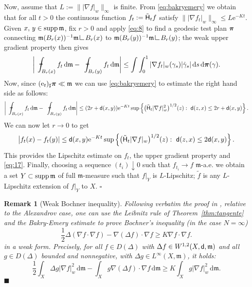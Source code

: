 \documentclass[reqno,11pt]{article}
\numberwithin{equation}{section}
\newcommand{\mm}{{\mbox{\boldmath$m$}}}
\newcommand{\ppi}{{\mbox{\boldmath$\pi$}}}
\newcommand{\sfd}{{\sf d}}
\newcommand{\rme}{{\mathrm e}}
\newcommand{\supp}{\mathop{\rm supp}\nolimits}   %
\renewcommand{\d}{{\mathrm d}}
\newcommand{\media}{\mkern12mu\hbox{\vrule height4pt           %
          depth-3.2pt                                 %
          width5pt}\mkern-16.5mu\int\nolimits}        %
\newenvironment{proof}{\removelastskip\par\medskip   %
\noindent{\em Proof.}
\rm}{\penalty-20\null\hfill$\square$\par\medbreak}
\newtheorem{remark}[theorem]{Remark}
\newcommand{\e}{{\rm{e}}}                           %
\newcommand{\fr}{\hfill$\blacksquare$}                      %
\newcommand{\weakgrad}[1]{|\nabla #1|_w}                %
\newcommand{\res}{\mathop{\hbox{\vrule height 7pt width .5pt depth 0pt
\vrule height .5pt width 6pt depth 0pt}}\nolimits} %
\newcommand{\heatl}{{\sf H}}
\newcommand{\Deltam}{\Delta}
\renewcommand{\mm}{\mathfrak m}
\begin{document}
\begin{proof}
Now, assume that $L:=\|\weakgrad{f}\|_\infty$ is finite. From
\eqref{eq:bakryemery} we obtain that for all $t>0$ the continuous
function $f_t:=\tilde\heatl_t f$ satisfy
$\|\weakgrad{f_t}\|_\infty\leq L\rme^{-Kt}$. Given
$x,\,y\in\supp\mm$, fix $r>0$ and apply \eqref{eq:8} to find a
geodesic test plan $\ppi$ connecting $\mm(B_r(x))^{-1} \mm\res
B_r(x)$ to $\mm(B_r(y))^{-1} \mm\res B_r(y)$; the weak upper
gradient property then gives
$$
\biggl|\media_{B_r(x)}f_t \,\d\mm-
\media_{B_r(y)}f_t\,\d\mm\biggr|\leq \int
\int_0^1\weakgrad{f_t}(\gamma_s)|\dot\gamma_s|\,\d
s\,\d\ppi(\gamma).
$$
Now, since $(\e_t)_\sharp\ppi\ll\mm$ we can use
\eqref{eq:bakryemery} to estimate the right hand side as follows:
$$
\biggl| \media_{B_r(x)}f_t\,\d\mm-
\media_{B_r(y)}f_t\,\d\mm\biggr|\leq
(2r+\sfd(x,y))\rme^{-Kt}\sup\left\{\bigl(\tilde\heatl_t\weakgrad{f}^2\bigr)^{1/2}(z):\
\sfd(z,x)\leq 2r+\sfd(x,y) \right\}.
$$
We can now let $r\to 0$ to get
$$
\bigl|f_t(x)-f_t(y)|\leq\sfd(x,y)
\rme^{-Kt}\sup\left\{\bigl(\tilde\heatl_t\weakgrad{f}\bigr)^{1/2}(z):\
\sfd(z,x)\leq 2\sfd(x,y)\right\}.
$$
This provides the Lipschitz estimate on $f_t$, the upper gradient
property and \eqref{eq:17}. Finally, choosing a sequence
$(t_i)\downarrow 0$ such that $f_{t_i}\to f$ $\mm$-a.e. we obtain a
set $Y\subset\supp\mm$ of full $\mm$-measure such that $f\vert_{Y}$
is $L$-Lipschitz; $\tilde{f}$ is any $L$-Lipschitz extension of
$f\vert_{Y}$ to $X$.
\end{proof}

\begin{remark}[Weak Bochner inequality] {\rm
Following \emph{verbatim} the proof in
\cite[Theorem~4.6]{GigliKuwadaOhta10}, relative to the Alexandrov
case, one can use the Leibnitz rule of Theorem~\ref{thm:tangente}
and the Bakry-Emery estimate to prove Bochner's inequality (in the
case $N=\infty$)
$$
\frac12\Delta (\nabla f\cdot\nabla f)-\nabla(\Deltam f)\cdot\nabla
f\geq K\nabla f\cdot\nabla f.
$$
in a weak form. Precisely, for all $f\in D(\Deltam)$ with $\Delta
f\in W^{1,2}(X,\sfd,\mm)$ and all $g\in D(\Deltam)$ bounded and
nonnegative, with $\Deltam g\in L^\infty(X,\mm)$, it holds:
$$
\frac12\int_X\Delta g\weakgrad f^2\,\d\mm-\int_X g\nabla(\Deltam
f)\cdot\nabla f\,\d\mm\geq K\int_X g\weakgrad f^2\,\d\mm.
$$}\fr
\end{remark}
\end{document}
